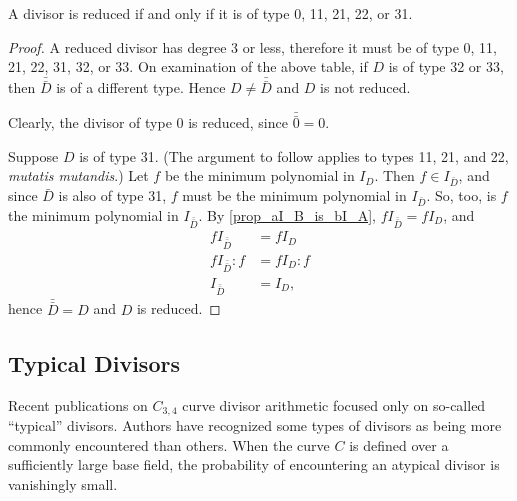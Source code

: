 \begin{theorem}
  A divisor is reduced if and only if it is of type 0, 11, 21, 22, or 31.
\end{theorem}
\begin{proof}
  A reduced divisor has degree 3 or less, therefore it must be of type 0, 11, 21, 22, 31, 32, or 33.
  On examination of the above table, if $D$ is of type 32 or 33, then $\bar{\bar D}$ is of a different type.
  Hence $D \neq \bar{\bar D}$ and $D$ is not reduced.
  
  Clearly, the divisor of type 0 is reduced, since $\bar{\bar 0} = 0$.
  
  Suppose $D$ is of type 31.
  (The argument to follow applies to types 11, 21, and 22, \emph{mutatis mutandis}.)
  Let $f$ be the minimum polynomial in $I_D$.
  Then $f \in I_{\bar D}$, and since $\bar D$ is also of type 31, $f$ must be the minimum polynomial in $I_{\bar D}$.
  So, too, is $f$ the minimum polynomial in $I_{\bar{\bar D}}$.
  By \ref{prop_aI_B_is_bI_A}, $f I_{\bar{\bar D}} = f I_D$, and
  \begin{align*}
    f I_{\bar{\bar D}} &= f I_D \\
    f I_{\bar{\bar D}} : f &= f I_D : f \\
    I_{\bar{\bar D}} &= I_D,
  \end{align*}
  hence $\bar{\bar D} = D$ and $D$ is reduced.
\end{proof}




\subsection{Typical Divisors}

Recent publications on $C_{3,4}$ curve divisor arithmetic focused only on so-called ``typical'' divisors.
Authors have recognized some types of divisors as being more commonly encountered than others.
When the curve $C$ is defined over a sufficiently large base field,
the probability of encountering an atypical divisor is vanishingly small.

